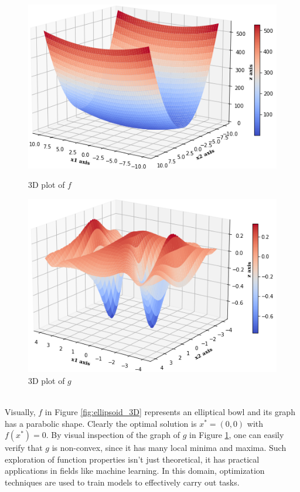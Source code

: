\begin{figure}[h]
  \centering
  \begin{minipage}[b]{0.38\textwidth}
    \includegraphics[width=\textwidth]{Pictures/3D plot of ellipsoid.png}
    \caption{3D plot of $f$}\label{fig:ellipsoid_3D}
  \end{minipage}
  \hspace{0.3cm} 
  \begin{minipage}[b]{0.38\textwidth}
    \includegraphics[width=\textwidth]{Pictures/3D plot of non convex.png}
    \caption{3D plot of $g$}\label{fig:Nonconvex_3D}
  \end{minipage}
\end{figure}\\
Visually, $f$ in Figure \ref{fig:ellipsoid_3D} represents an elliptical bowl and its graph has a parabolic shape. Clearly the optimal solution is $x^{*} = (0,0)$ with $f(x^{*}) = 0$. By visual inspection of the graph of $g$ in Figure \ref{fig:Nonconvex_3D}, one can easily verify that $g$ is non-convex, since it has many local minima and maxima. Such exploration of function properties isn't just theoretical, it has practical applications in fields like machine learning. In this domain, optimization techniques are used to train models to effectively carry out tasks. 
